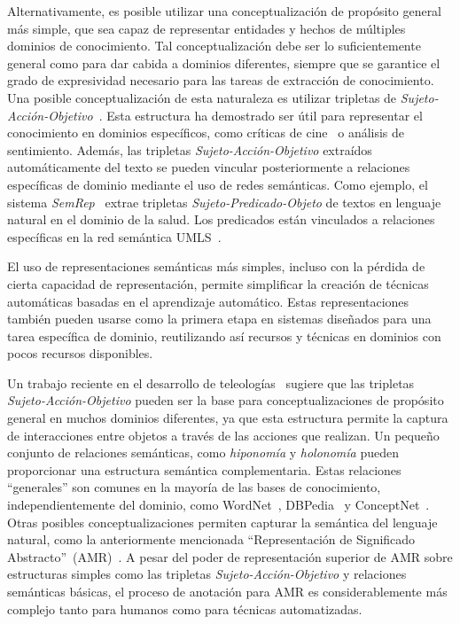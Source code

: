 Alternativamente, es posible utilizar una conceptualización de propósito general más simple, que sea capaz de representar entidades y hechos de múltiples dominios de conocimiento.
Tal conceptualización debe ser lo suficientemente general como para dar cabida a dominios diferentes, siempre que se garantice el grado de expresividad necesario para las tareas de extracción de conocimiento.
Una posible conceptualización de esta naturaleza es utilizar tripletas de \textit{Sujeto-Acción-Objetivo}~\cite{suilan2018}.
Esta estructura ha demostrado ser útil para representar el conocimiento en dominios específicos, como críticas de cine~\cite{suilan2018} o análisis de sentimiento.
Además, las tripletas \textit{Sujeto-Acción-Objetivo} extraídos automáticamente del texto se pueden vincular posteriormente a relaciones específicas de dominio mediante el uso de redes semánticas.
Como ejemplo, el sistema \textit{SemRep}~\cite{semrep} extrae tripletas \textit{Sujeto-Predicado-Objeto} de textos en lenguaje natural en el dominio de la salud.
Los predicados están vinculados a relaciones específicas en la red semántica UMLS~\cite{umls}.

El uso de representaciones semánticas más simples, incluso con la pérdida de cierta capacidad de representación, permite simplificar la creación de técnicas automáticas basadas en el aprendizaje automático.
Estas representaciones también pueden usarse como la primera etapa en sistemas diseñados para una tarea específica de dominio, reutilizando así recursos y técnicas en dominios con pocos recursos disponibles.

Un trabajo reciente en el desarrollo de teleologías~\cite{teleologies} sugiere que las tripletas \textit{Sujeto-Acción-Objetivo} pueden ser la base para conceptualizaciones de propósito general en muchos dominios diferentes, ya que esta estructura permite la captura de interacciones entre objetos a través de las acciones que realizan.
Un pequeño conjunto de relaciones semánticas, como \textit{hiponomía} y \textit{holonomía} pueden proporcionar una estructura semántica complementaria.
Estas relaciones ``generales'' son comunes en la mayoría de las bases de conocimiento, independientemente del dominio, como WordNet~\cite{miller1998wordnet},
DBPedia~\cite{lehmann2015dbpedia} y ConceptNet~\cite{conceptnet}.
Otras posibles conceptualizaciones permiten capturar la semántica del lenguaje natural, como la anteriormente mencionada ``Representación de Significado Abstracto''~(AMR)~\cite{amr}.
A pesar del poder de representación superior de AMR sobre estructuras simples como las tripletas \textit{Sujeto-Acción-Objetivo} y relaciones semánticas básicas, el proceso de anotación para AMR es considerablemente más complejo tanto para humanos como para técnicas automatizadas.

